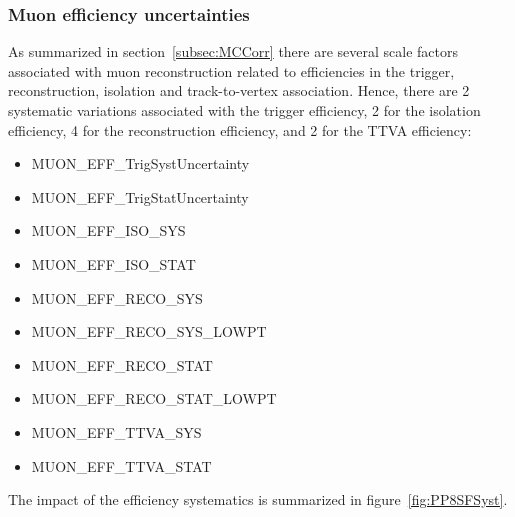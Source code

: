 \subsubsection{Muon efficiency uncertainties}
As summarized in section~\ref{subsec:MCCorr} there are several scale factors associated with muon reconstruction related to efficiencies in the trigger, reconstruction, isolation and track-to-vertex association.
Hence, there are 2 systematic variations associated with the trigger efficiency, 2 for the isolation efficiency, 4 for the reconstruction efficiency, and 2 for the TTVA efficiency:
\begin{itemize}
  \setlength{\itemsep}{1pt}\setlength{\parskip}{0pt}\setlength{\parsep}{0pt}
  \item MUON\_EFF\_TrigSystUncertainty
  \item MUON\_EFF\_TrigStatUncertainty
  \item MUON\_EFF\_ISO\_SYS
  \item MUON\_EFF\_ISO\_STAT
  \item MUON\_EFF\_RECO\_SYS
  \item MUON\_EFF\_RECO\_SYS\_LOWPT
  \item MUON\_EFF\_RECO\_STAT
  \item MUON\_EFF\_RECO\_STAT\_LOWPT
  \item MUON\_EFF\_TTVA\_SYS
  \item MUON\_EFF\_TTVA\_STAT
\end{itemize}

The impact of the efficiency systematics is summarized in figure~\ref{fig:PP8SFSyst}.


